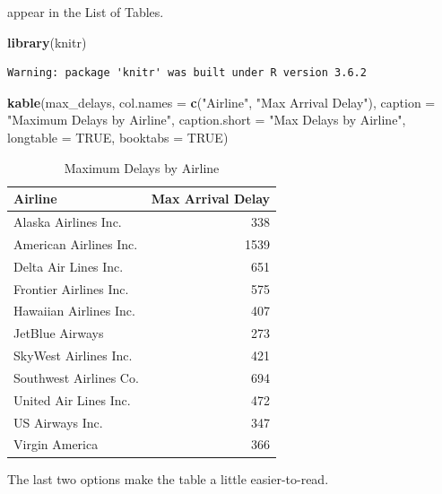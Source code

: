 \documentclass [11pt, proquest] {uwthesis}[2015/03/03]
\newenvironment{Shaded}{}{}
\newcommand{\KeywordTok}[1]{\textcolor[rgb]{0.00,0.44,0.13}{\textbf{{#1}}}}
\newcommand{\DataTypeTok}[1]{\textcolor[rgb]{0.56,0.13,0.00}{{#1}}}
\newcommand{\StringTok}[1]{\textcolor[rgb]{0.25,0.44,0.63}{{#1}}}
\newcommand{\OtherTok}[1]{\textcolor[rgb]{0.00,0.44,0.13}{{#1}}}
\newcommand{\NormalTok}[1]{{#1}}
\begin{document}
appear in the List of Tables.
\begin{Shaded}
\begin{Highlighting}[]
\KeywordTok{library}\NormalTok{(knitr)}
\end{Highlighting}
\end{Shaded}
\begin{verbatim}
Warning: package 'knitr' was built under R version 3.6.2
\end{verbatim}
\begin{Shaded}
\begin{Highlighting}[]
\KeywordTok{kable}\NormalTok{(max_delays,}
      \DataTypeTok{col.names =} \KeywordTok{c}\NormalTok{(}\StringTok{"Airline"}\NormalTok{, }\StringTok{"Max Arrival Delay"}\NormalTok{),}
      \DataTypeTok{caption =} \StringTok{"Maximum Delays by Airline"}\NormalTok{,}
      \DataTypeTok{caption.short =} \StringTok{"Max Delays by Airline"}\NormalTok{,}
      \DataTypeTok{longtable =} \OtherTok{TRUE}\NormalTok{,}
      \DataTypeTok{booktabs =} \OtherTok{TRUE}\NormalTok{)}
\end{Highlighting}
\end{Shaded}
\begin{longtable}[t]{lr}
\caption[Max Delays by Airline]{\label{tab:maxdelays}Maximum Delays by Airline}\\
\toprule
Airline & Max Arrival Delay\\
\midrule
Alaska Airlines Inc. & 338\\
American Airlines Inc. & 1539\\
Delta Air Lines Inc. & 651\\
Frontier Airlines Inc. & 575\\
Hawaiian Airlines Inc. & 407\\
\addlinespace
JetBlue Airways & 273\\
SkyWest Airlines Inc. & 421\\
Southwest Airlines Co. & 694\\
United Air Lines Inc. & 472\\
US Airways Inc. & 347\\
\addlinespace
Virgin America & 366\\
\bottomrule
\end{longtable}
The last two options make the table a little easier-to-read.
\end{document}
